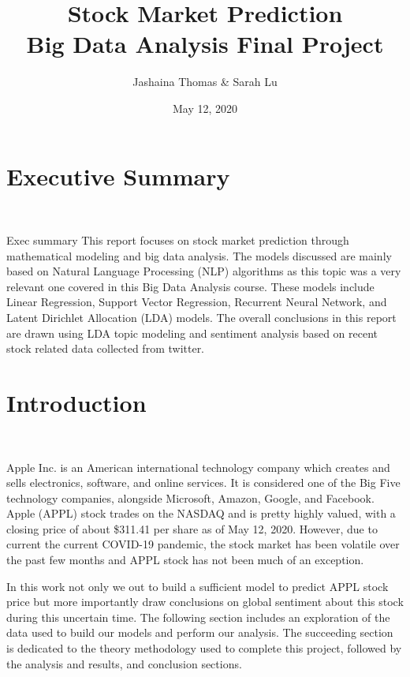 \documentclass[11pt, oneside]{article}   	%
\title{Stock Market Prediction \\ Big Data Analysis Final Project}
\author{Jashaina Thomas \& Sarah Lu}
\date{May 12, 2020}							%
\begin{document}
\maketitle

\newpage

\tableofcontents

\newpage
\section{Executive Summary} \

Exec summary
This report focuses on stock market prediction through mathematical modeling and big data analysis. The models discussed are mainly based on Natural Language Processing (NLP) algorithms as this topic was a very relevant one covered in this Big Data Analysis course. These models include Linear Regression, Support Vector Regression, Recurrent Neural Network, and Latent Dirichlet Allocation (LDA) models. The overall conclusions in this report are drawn using LDA topic modeling and sentiment analysis based on recent stock related data collected from twitter. 
 

\section{Introduction} \

 Apple Inc. is an American international technology company which creates and sells electronics, software, and online services. It is considered one of the Big Five technology companies, alongside Microsoft, Amazon, Google, and Facebook. Apple (APPL) stock trades on the NASDAQ and is pretty highly valued, with a closing price of about \$311.41 per share as of May 12, 2020. However, due to current the current COVID-19 pandemic, the stock market has been volatile over the past few months and APPL stock has not been much of an exception. 

  In this work not only we out to build a sufficient model to predict APPL stock price but more importantly draw conclusions on global sentiment about this stock during this uncertain time. The following section includes an exploration of the data used to build our models and perform our analysis. The succeeding section is dedicated to the theory methodology used to complete this project, followed by the analysis and results, and conclusion sections. 
\end{document}
